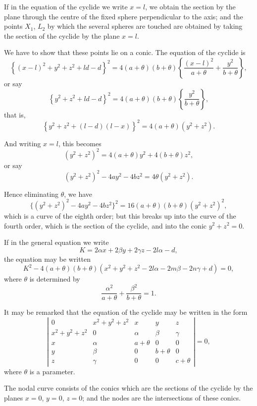 \documentclass[11pt,a4paper]{book}
\begin{document}
If in the equation of the cyclide we write $x = l$, we obtain the section by the plane through the centre of the fixed sphere perpendicular to the axis; and the points $X_1$, $L_2$ by which the several spheres are touched are obtained by taking the section of the cyclide by the plane $x = l$.

We have to show that these points lie on a conic. The equation of the cyclide is
\[
\left\{ (x - l)^2 + y^2 + z^2 + ld - d \right\}^2 = 4(a + \theta)(b + \theta)\left\{ \frac{(x - l)^2}{a + \theta} + \frac{y^2}{b + \theta} \right\},
\]
or say
\[
\left\{ y^2 + z^2 + ld - d \right\}^2 = 4(a + \theta)(b + \theta) \left\{ \frac{y^2}{b + \theta} \right\},
\]
that is,
\[
\left\{ y^2 + z^2 + (l - d)(l - x) \right\}^2 = 4(a + \theta)(y^2 + z^2).
\]

And writing $x = l$, this becomes
\[
(y^2 + z^2)^2 = 4(a + \theta)y^2 + 4(b + \theta)z^2,
\]
or say
\[
(y^2 + z^2)^2 - 4ay^2 - 4bz^2 = 4\theta(y^2 + z^2).
\]

Hence eliminating $\theta$, we have
\[
\{ (y^2 + z^2)^2 - 4ay^2 - 4bz^2 \}^2 = 16(a + \theta)(b + \theta)(y^2 + z^2)^2,
\]
which is a curve of the eighth order; but this breaks up into the curve of the fourth order, which is the section of the cyclide, and into the conic $y^2 + z^2 = 0$.

\newpage

If in the general equation we write
\[
K = 2\alpha x + 2\beta y + 2\gamma z - 2l\alpha - d,
\]
the equation may be written
\[
K^2 - 4(a + \theta)(b + \theta)(x^2 + y^2 + z^2 - 2l\alpha - 2m\beta - 2n\gamma + d) = 0,
\]
where $\theta$ is determined by
\[
\frac{\alpha^2}{a + \theta} + \frac{\beta^2}{b + \theta} = 1.
\]

It may be remarked that the equation of the cyclide may be written in the form
\[
\left| \begin{array}{ccccc}
0 & x^2 + y^2 + z^2 & x & y & z \\
x^2 + y^2 + z^2 & 0 & \alpha & \beta & \gamma \\
x & \alpha & a + \theta & 0 & 0 \\
y & \beta & 0 & b + \theta & 0 \\
z & \gamma & 0 & 0 & c + \theta
\end{array} \right| = 0,
\]
where $\theta$ is a parameter.

The nodal curve consists of the conics which are the sections of the cyclide by the planes $x = 0$, $y = 0$, $z = 0$; and the nodes are the intersections of these conics.
\end{document}
